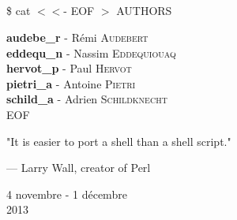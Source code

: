 \begin{titlepage}
    \begin{center}
        \textsc{\Large \reportsubject}\\[0.5cm]
        \HRule \\[0.4cm]
        {\huge \bfseries \reporttitle}\\[0.4cm]
        \HRule \\[1.5cm]
        \begin{minipage}[t]{0.8\textwidth}
                \huge \$ cat $<<$- EOF $>$ AUTHORS
        \end{minipage}

        \bigskip

        \begin{minipage}[t]{0.6\textwidth}
            \begin{flushleft} \large
                \textbf{audebe\_r} - Rémi \textsc{Audebert} \\
                \textbf{eddequ\_n} - Nassim \textsc{Eddequiouaq} \\
                \textbf{hervot\_p} - Paul \textsc{Hervot} \\
                \textbf{pietri\_a} - Antoine \textsc{Pietri} \\
                \textbf{schild\_a} - Adrien \textsc{Schildknecht} \\
                EOF \\
            \end{flushleft}
        \end{minipage}
        \vfill

        \epigraph{
        "It is easier to port a shell than a shell script."}{--- \textup{Larry
        Wall}, creator of Perl}

        {4 novembre - 1 décembre \\ 2013}

    \end{center}

\end{titlepage}
